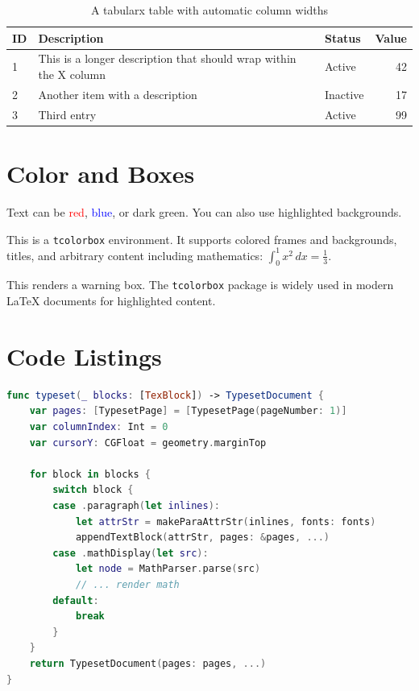 \documentclass[12pt,a4paper]{article}
\begin{document}
\begin{table}[h]
  \centering
  \caption{A tabularx table with automatic column widths}
  \label{tab:tabularx}
  \begin{tabularx}{\textwidth}{lXlr}
    \toprule
    ID & Description & Status & Value \\
    \midrule
    1 & This is a longer description that should wrap within the X column & Active & 42 \\
    2 & Another item with a description & Inactive & 17 \\
    3 & Third entry & Active & 99 \\
    \bottomrule
  \end{tabularx}
\end{table}

\section{Color and Boxes}
\label{sec:color}

Text can be \textcolor{red}{red}, \textcolor{blue}{blue}, or
\textcolor{green!60!black}{dark green}. You can also use
\colorbox{yellow!30}{highlighted backgrounds}.

\begin{tcolorbox}[title=Important Note, colback=blue!5!white, colframe=blue!75!black]
This is a \texttt{tcolorbox} environment. It supports colored frames and backgrounds,
titles, and arbitrary content including mathematics: $\int_0^1 x^2\,dx = \frac{1}{3}$.
\end{tcolorbox}

\begin{tcolorbox}[colback=red!5!white, colframe=red!75!black, title=Warning]
This renders a warning box. The \texttt{tcolorbox} package is widely used in
modern \LaTeX{} documents for highlighted content.
\end{tcolorbox}

\section{Code Listings}
\label{sec:code}

\begin{lstlisting}[language=Swift, caption={Main rendering function}, label=lst:render]
func typeset(_ blocks: [TexBlock]) -> TypesetDocument {
    var pages: [TypesetPage] = [TypesetPage(pageNumber: 1)]
    var columnIndex: Int = 0
    var cursorY: CGFloat = geometry.marginTop
    
    for block in blocks {
        switch block {
        case .paragraph(let inlines):
            let attrStr = makeParaAttrStr(inlines, fonts: fonts)
            appendTextBlock(attrStr, pages: &pages, ...)
        case .mathDisplay(let src):
            let node = MathParser.parse(src)
            // ... render math
        default:
            break
        }
    }
    return TypesetDocument(pages: pages, ...)
}
\end{lstlisting}
\end{document}

